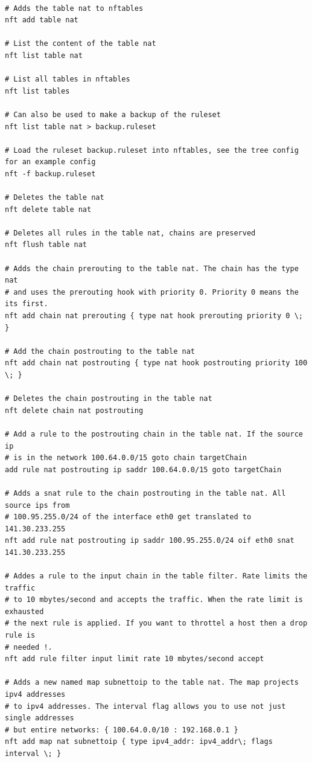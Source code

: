 \documentclass{report}
\begin{document}
\begin{verbatim}

# Adds the table nat to nftables
nft add table nat

# List the content of the table nat
nft list table nat

# List all tables in nftables
nft list tables

# Can also be used to make a backup of the ruleset
nft list table nat > backup.ruleset

# Load the ruleset backup.ruleset into nftables, see the tree config for an example config
nft -f backup.ruleset

# Deletes the table nat
nft delete table nat

# Deletes all rules in the table nat, chains are preserved
nft flush table nat

# Adds the chain prerouting to the table nat. The chain has the type nat
# and uses the prerouting hook with priority 0. Priority 0 means the its first.
nft add chain nat prerouting { type nat hook prerouting priority 0 \; }

# Add the chain postrouting to the table nat
nft add chain nat postrouting { type nat hook postrouting priority 100 \; }

# Deletes the chain postrouting in the table nat
nft delete chain nat postrouting

# Add a rule to the postrouting chain in the table nat. If the source ip 
# is in the network 100.64.0.0/15 goto chain targetChain
add rule nat postrouting ip saddr 100.64.0.0/15 goto targetChain

# Adds a snat rule to the chain postrouting in the table nat. All source ips from
# 100.95.255.0/24 of the interface eth0 get translated to 141.30.233.255
nft add rule nat postrouting ip saddr 100.95.255.0/24 oif eth0 snat 141.30.233.255

# Addes a rule to the input chain in the table filter. Rate limits the traffic 
# to 10 mbytes/second and accepts the traffic. When the rate limit is exhausted 
# the next rule is applied. If you want to throttel a host then a drop rule is 
# needed !.
nft add rule filter input limit rate 10 mbytes/second accept

# Adds a new named map subnettoip to the table nat. The map projects ipv4 addresses
# to ipv4 addresses. The interval flag allows you to use not just single addresses 
# but entire networks: { 100.64.0.0/10 : 192.168.0.1 }
nft add map nat subnettoip { type ipv4_addr: ipv4_addr\; flags interval \; }


\end{verbatim}
\end{document}
